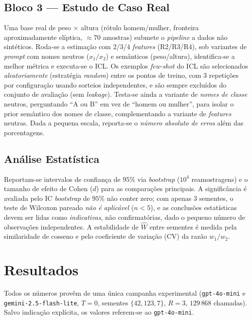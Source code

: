 \documentclass[12pt,a4paper]{article}
\newcommand{\West}{\ensuremath{\hat{W}}}   %
\begin{document}
\subsection{Bloco 3 — Estudo de Caso Real}

Uma base real de peso $\times$ altura (rótulo homem/mulher, fronteira aproximadamente
elíptica, $\approx 70$ amostras) submete o \emph{pipeline} a dados não sintéticos. Roda-se a
estimação com $2$/$3$/$4$ \emph{features} (R2/R3/R4), sob variantes de \emph{prompt} com
nomes neutros ($x_1/x_2$) e semânticos (peso/altura), identifica-se a melhor métrica e
executa-se o ICL. Os exemplos \emph{few-shot} do ICL são selecionados
\emph{aleatoriamente} (estratégia \emph{random}) entre os pontos de treino, com $3$
repetições por configuração usando sorteios independentes, e são sempre excluídos do
conjunto de avaliação (sem \emph{leakage}). Testa-se ainda a variante de \emph{nomes de
classe} neutros, perguntando ``A ou B'' em vez de ``homem ou mulher'', para isolar o
prior semântico dos nomes de classe, complementando a variante de \emph{features}
neutras. Dada a pequena escala, reporta-se o \emph{número absoluto de erros} além
das porcentagens.

\subsection{Análise Estatística}

Reportam-se intervalos de confiança de $95\%$ via \emph{bootstrap} ($10^4$ reamostragens)
e o tamanho de efeito de Cohen ($d$) para as comparações principais. A significância é
avaliada pelo IC \emph{bootstrap} de $95\%$ não conter zero; com apenas $3$ sementes, o
teste de Wilcoxon pareado \emph{não é aplicável} ($n<5$), e as conclusões estatísticas
devem ser lidas como \emph{indicativas}, não confirmatórias, dado o pequeno número de
observações independentes. A estabilidade de \West{} entre sementes é medida pela
similaridade de cosseno e pelo coeficiente de variação (CV) da razão $w_1/w_2$.

\section{Resultados}
\label{sec:resultados}

Todos os números provêm de uma única campanha experimental
(\texttt{gpt-4o-mini} e \texttt{gemini-2.5-flash-lite}, $T=0$, sementes $\{42,123,7\}$,
$R=3$, $129\,868$ chamadas). Salvo indicação explícita, os valores referem-se ao
\texttt{gpt-4o-mini}.
\end{document}
